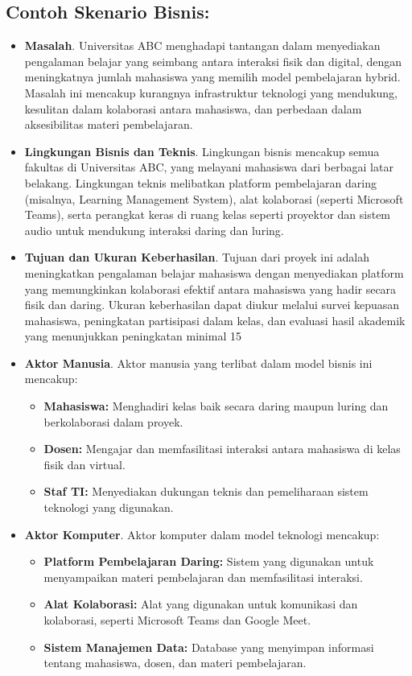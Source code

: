 \subsection*{Contoh Skenario Bisnis:}
\begin{itemize}
	\item \textbf{Masalah}. Universitas ABC menghadapi tantangan dalam menyediakan pengalaman belajar yang seimbang antara interaksi fisik dan digital, dengan meningkatnya jumlah mahasiswa yang memilih model pembelajaran hybrid. Masalah ini mencakup kurangnya infrastruktur teknologi yang mendukung, kesulitan dalam kolaborasi antara mahasiswa, dan perbedaan dalam aksesibilitas materi pembelajaran.
	
	\item \textbf{Lingkungan Bisnis dan Teknis}. Lingkungan bisnis mencakup semua fakultas di Universitas ABC, yang melayani mahasiswa dari berbagai latar belakang. Lingkungan teknis melibatkan platform pembelajaran daring (misalnya, Learning Management System), alat kolaborasi (seperti Microsoft Teams), serta perangkat keras di ruang kelas seperti proyektor dan sistem audio untuk mendukung interaksi daring dan luring.
	
	\item \textbf{Tujuan dan Ukuran Keberhasilan}. Tujuan dari proyek ini adalah meningkatkan pengalaman belajar mahasiswa dengan menyediakan platform yang memungkinkan kolaborasi efektif antara mahasiswa yang hadir secara fisik dan daring. Ukuran keberhasilan dapat diukur melalui survei kepuasan mahasiswa, peningkatan partisipasi dalam kelas, dan evaluasi hasil akademik yang menunjukkan peningkatan minimal 15%
	
	\item \textbf{Aktor Manusia}. Aktor manusia yang terlibat dalam model bisnis ini mencakup:
	\begin{itemize}
		\item \textbf{Mahasiswa:} Menghadiri kelas baik secara daring maupun luring dan berkolaborasi dalam proyek.
		\item \textbf{Dosen:} Mengajar dan memfasilitasi interaksi antara mahasiswa di kelas fisik dan virtual.
		\item \textbf{Staf TI:} Menyediakan dukungan teknis dan pemeliharaan sistem teknologi yang digunakan.
	\end{itemize}
	
	\item \textbf{Aktor Komputer}. Aktor komputer dalam model teknologi mencakup:
	\begin{itemize}
		\item \textbf{Platform Pembelajaran Daring:} Sistem yang digunakan untuk menyampaikan materi pembelajaran dan memfasilitasi interaksi.
		\item \textbf{Alat Kolaborasi:} Alat yang digunakan untuk komunikasi dan kolaborasi, seperti Microsoft Teams dan Google Meet.
		\item \textbf{Sistem Manajemen Data:} Database yang menyimpan informasi tentang mahasiswa, dosen, dan materi pembelajaran.
	\end{itemize}
	

\end{itemize}
